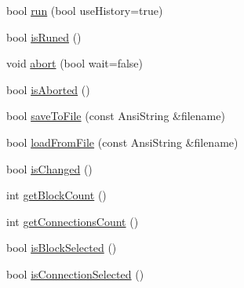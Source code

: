 \begin{CompactItemize}
bool \hyperlink{classPIWOEngine_d20139057c6b68e8e4e2fb0d0e04926b}{run} (bool useHistory=true)
\item 
bool \hyperlink{classPIWOEngine_b8cd8305728eb8998011af59677084ad}{isRuned} ()
\item 
void \hyperlink{classPIWOEngine_134ab9db62730d3a680f24bf33068672}{abort} (bool wait=false)
\item 
bool \hyperlink{classPIWOEngine_8505bb4deb5c952d8f93d5b656f385cf}{isAborted} ()
\item 
bool \hyperlink{classPIWOEngine_dee854cac7e50d95de9613e2bbdb4676}{saveToFile} (const AnsiString \&filename)
\item 
bool \hyperlink{classPIWOEngine_84deceb11d30a25d104a2b34afad27d4}{loadFromFile} (const AnsiString \&filename)
\item 
bool \hyperlink{classPIWOEngine_994cb25914cba46f02bdf14909991247}{isChanged} ()
\item 
int \hyperlink{classPIWOEngine_070ee971be58a47520dd7e5063e5508e}{getBlockCount} ()
\item 
int \hyperlink{classPIWOEngine_1c1eb9af5a92cf907bdce516de31af37}{getConnectionsCount} ()
\item 
bool \hyperlink{classPIWOEngine_ff65b56ee08c0ccbdd9724ebc08dc2ad}{isBlockSelected} ()
\item 
bool \hyperlink{classPIWOEngine_7bd61a1844a459b79a07a3ecf08d72a3}{isConnectionSelected} ()
\end{CompactItemize}
